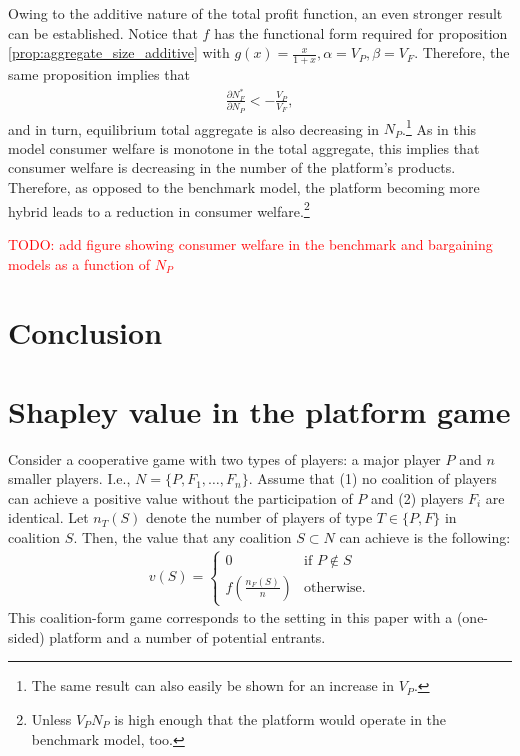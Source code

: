 \documentclass[a4paper]{article}
\begin{document}
Owing to the additive nature of the total profit function, an even stronger result can be established.
Notice that $f$ has the functional form required for proposition \ref{prop:aggregate_size_additive} with $g(x) = \frac{x}{1+x}, \alpha = V_P, \beta = V_F$.
Therefore, the same proposition implies that
\begin{align*}
    \frac{\partial N_F^*}{\partial N_P} < -\frac{V_P}{V_F},
\end{align*}
and in turn, equilibrium total aggregate is also decreasing in $N_P$.\footnote{
    The same result can also easily be shown for an increase in $V_P$.
}
As in this model consumer welfare is monotone in the total aggregate, this implies that consumer welfare is decreasing in the number of the platform's products.
Therefore, as opposed to the benchmark model, the platform becoming more hybrid leads to a reduction in consumer welfare.\footnote{
    Unless $V_P N_P$ is high enough that the platform would operate in the benchmark model, too.
}

\textcolor{red}{TODO: add figure showing consumer welfare in the benchmark and bargaining models as a function of $N_P$}



\section{Conclusion}


\appendix

\printbibliography


\section{Shapley value in the platform game}

Consider a cooperative game with two types of players: a major player $P$ and $n$ smaller players.
I.e., $N = \{P, F_1, \dots, F_n\}$.
Assume that (1) no coalition of players can achieve a positive value without the participation of $P$ and (2) players $F_i$ are identical.
Let $n_T(S)$ denote the number of players of type $T \in \{P, F\}$ in coalition $S$. Then, the value that any coalition $S \subset N$ can achieve is the following:
\begin{align*}
    v(S) = \begin{cases}
        0                              & \text{if } P \notin S \\
        f\left(\frac{n_F(S)}{n}\right) & \text{otherwise}.
    \end{cases}
\end{align*}
This coalition-form game corresponds to the setting in this paper with a (one-sided) platform and a number of potential entrants.
\end{document}
